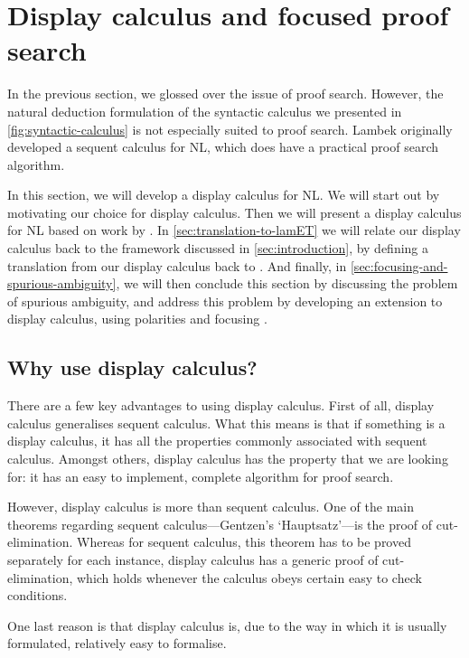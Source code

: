 \section{Display calculus and focused proof search}
\label{sec:display-calculus}

In the previous section, we glossed over the issue of proof
search. However, the natural deduction formulation of the syntactic
calculus we presented in \autoref{fig:syntactic-calculus} is not
especially suited to proof search. Lambek originally developed a
sequent calculus for NL, which does have a practical proof search
algorithm.

In this section, we will develop a display calculus
\citep{belnap1982} for NL. We will start out by motivating our choice
for display calculus. Then we will present a display calculus for NL
based on work by \citet{moortgat2012,gore1998}.
In \autoref{sec:translation-to-lamET} we will relate our display
calculus back to the framework discussed in
\autoref{sec:introduction}, by defining a translation from our display
calculus back to \lamET.
And finally, in \autoref{sec:focusing-and-spurious-ambiguity}, we will
then conclude this section by discussing the problem of spurious
ambiguity, and address this problem by developing an extension to
display calculus, using polarities and focusing
\citep{girard1991,bastenhof2011}.

\subsection{Why use display calculus?}
\label{sec:why-use-display-calculus}
There are a few key advantages to using display calculus. First of
all, display calculus generalises sequent calculus. What this means is
that if something is a display calculus, it has all the properties
commonly associated with sequent calculus. Amongst others, display
calculus has the property that we are looking for: it has an easy to
implement, complete algorithm for proof search.

However, display calculus is more than sequent calculus. One of the
main theorems regarding sequent calculus---Gentzen's `Hauptsatz'---is
the proof of cut-elimination. Whereas for sequent calculus, this
theorem has to be proved separately for each instance, display
calculus has a generic proof of cut-elimination, which holds whenever
the calculus obeys certain easy to check conditions.

One last reason is that display calculus is, due to the way in which
it is usually formulated, relatively easy to formalise.

